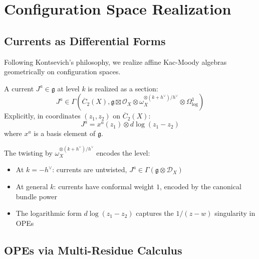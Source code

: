\section{Configuration Space Realization}

\subsection{Currents as Differential Forms}

Following Kontsevich's philosophy, we realize affine Kac-Moody algebras geometrically on configuration spaces.

\begin{construction}
A current $J^a \in \mathfrak{g}$ at level $k$ is realized as a section:
\begin{equation}
J^a \in \Gamma(\overline{C}_2(X), \mathfrak{g} \boxtimes \mathcal{O}_X \otimes \omega_X^{\otimes(k+h^\vee)/h^\vee} \otimes \Omega^1_{\log})
\end{equation}
Explicitly, in coordinates $(z_1, z_2)$ on $\overline{C}_2(X)$:
\begin{equation}
J^a = x^a(z_1) \otimes d\log(z_1-z_2)
\end{equation}
where $x^a$ is a basis element of $\mathfrak{g}$.
\end{construction}

\begin{remark}
The twisting by $\omega_X^{\otimes(k+h^\vee)/h^\vee}$ encodes the level:
\begin{itemize}
\item At $k = -h^\vee$: currents are untwisted, $J^a \in \Gamma(\mathfrak{g} \otimes \mathcal{D}_X)$
\item At general $k$: currents have conformal weight $1$, encoded by the canonical bundle power
\item The logarithmic form $d\log(z_1-z_2)$ captures the $1/(z-w)$ singularity in OPEs
\end{itemize}
\end{remark}

\subsection{OPEs via Multi-Residue Calculus}

